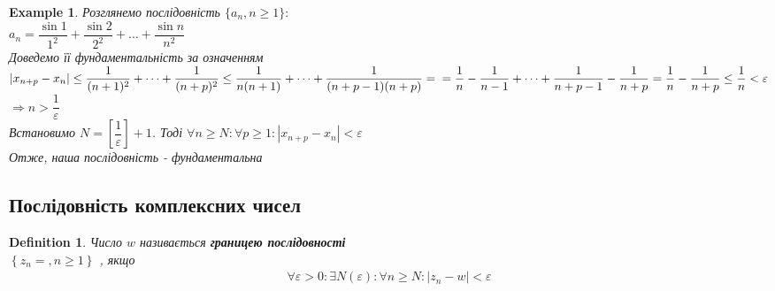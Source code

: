 \documentclass[a4paper, 14pt]{extarticle}
\def\huge{\displaystyle}
\newcommand{\sequence}[2][{}]{%
\ifthenelse{\equal{#1}{}}{$\{{#2}, n \geq 1 \}$}
{$\huge \left\{ {#2} = {#1}, n \geq 1 \right\}$}%
}
\theoremstyle{theoremdd}
\theoremstyle{theoremdd}
\newtheorem{definition}[theorem]{Definition}
\theoremstyle{theoremdd}
\theoremstyle{theoremdd}
\newtheorem{example}[theorem]{Example}
\theoremstyle{theoremdd}
\theoremstyle{theoremdd}
\theoremstyle{theoremdd}
\theoremstyle{theoremdd}
\begin{document}
	\begin{example}
	Розглянемо послідовність $\{a_n, n \geq 1\}:$\\
	$a_n = \dfrac{\sin 1}{1^2} + \dfrac{\sin 2}{2^2} + \dots + \dfrac{\sin n}{n^2}$\\
	Доведемо її фундаментальність за означенням\\
	$|x_{n+p} - x_n| \leq \dfrac{1}{(n+1)^2} + \dots + \dfrac{1}{(n+p)^2} \leq \dfrac{1}{n(n+1)} + \dots + \dfrac{1}{(n+p-1)(n+p)} = \\ = \dfrac{1}{n} - \dfrac{1}{n-1} + \dots + \dfrac{1}{n+p-1} - \dfrac{1}{n+p} = \dfrac{1}{n} - \dfrac{1}{n+p} \leq \dfrac{1}{n} < \varepsilon$\\
	$\Rightarrow n > \dfrac{1}{\varepsilon}$\\
	Встановимо $N = \left[ \dfrac{1}{\varepsilon} \right] + 1$. Тоді $\forall n \geq N: \forall p \geq 1: |x_{n+p} - x_n| < \varepsilon$\\
	Отже, наша послідовність - фундаментальна
	\end{example}
	
	\subsection{Послідовність комплексних чисел}
	\begin{definition}
	Число $w$ називається \textbf{границею послідовності} \\ \sequence{z_n}, якщо
	\begin{align*}
	\forall \varepsilon > 0: \exists N(\varepsilon): \forall n \geq N: |z_n - w| < \varepsilon
	\end{align*}
	\end{definition}
	
\end{document}
